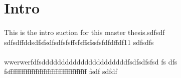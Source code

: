 \section{Intro}
\paragraph{}This is the intro suction for this master thesis.sdfsdf
sdfsdffddsdfsfsdfsdfsfsffsfsffsfssfsfdfdffdf11
sdfsdfs

\paragraph{}wwerwerfdfsddddddddddddddddddddddfsdfsdfsfsd
fs
dfs
fsffffffffffffffffffffffffffffffffffffff
fsdf
sdfdf